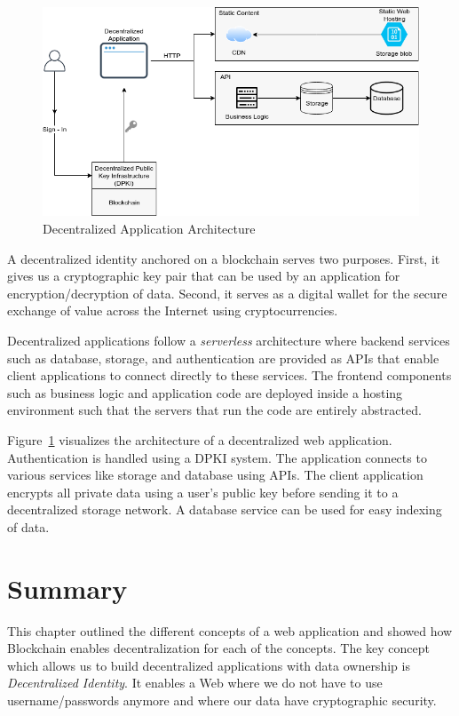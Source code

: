 	\begin{figure}[h]
		\includegraphics[width=\linewidth]{figures/dapp-architecture}
		\caption{\label{fig:dapp-architecture} Decentralized Application Architecture}
	\end{figure}

	A decentralized identity anchored on a blockchain serves two purposes. First, it gives us a cryptographic key pair that can be used by an application for encryption/decryption of data. Second, it serves as a digital wallet for the secure exchange of value across the Internet using cryptocurrencies.
	
	Decentralized applications follow a \textit{serverless} architecture where backend services such as database, storage, and authentication are provided as APIs that enable client applications to connect directly to these services. The frontend components such as business logic and application code are deployed inside a hosting environment such that the servers that run the code are entirely abstracted.
	
	Figure~\ref{fig:dapp-architecture} visualizes the architecture of a decentralized web application. Authentication is handled using a DPKI system. The application connects to various services like storage and database using APIs. The client application encrypts all private data using a user's public key before sending it to a decentralized storage network. A database service can be used for easy indexing of data.
	
\section{Summary}
	This chapter outlined the different concepts of a web application and showed how Blockchain enables decentralization for each of the concepts. The key concept which allows us to build decentralized applications with data ownership is \textit{Decentralized Identity}. It enables a Web where we do not have to use username/passwords anymore and where our data have cryptographic security.